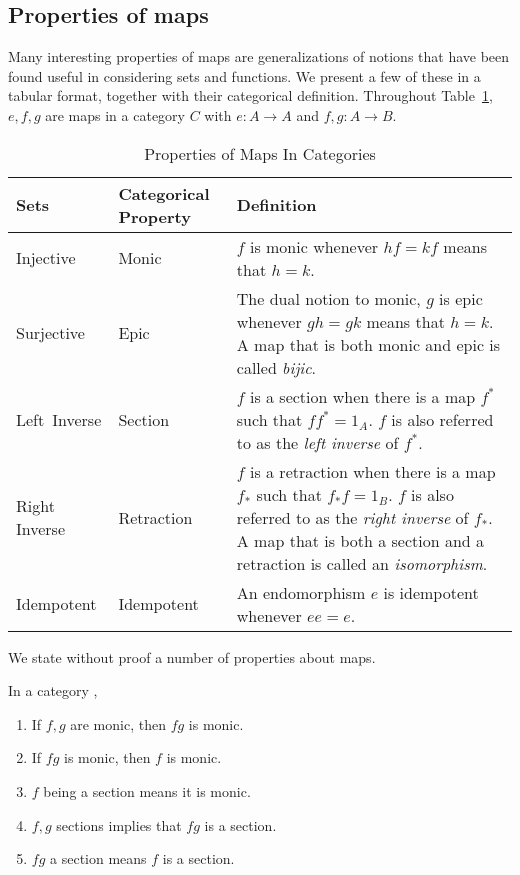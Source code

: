 \subsection{Properties of maps} %
\label{sub:properties_of_maps}
Many interesting properties of maps are generalizations of notions that have been found useful in
considering sets and functions. We present a few of these in a tabular format, together with their
categorical definition. Throughout Table~\ref{tab:properties_of_maps_in_categories}, $e,f,g$ are
maps in a category $C$ with $e:A \to A$ and $f,g:A \to B$.
\begin{table}[h!]
  \begin{center}
    \begin{tabular}{|p{1in}p{1in}p{3.73in}|}
      \hline
      {\bf Sets} & {\bf Categorical Property} & {\bf Definition}\\
      \hline
      \hline
      Injective & Monic & $f$ is monic whenever $h f = k f$ means that $h = k$.\\
      \hline
      Surjective & Epic & The dual notion to monic, $g$ is epic whenever $g h = g k$ means that $h = k$.
      A map that is both monic and epic is called \emph{bijic}.\\
      \hline
      Left~Inverse & Section & $f$ is a section when there is a map $f^*$ such that $f f^* = 1_A$. $f$
      is also referred to as the \emph{left inverse} of $f^*$.\\
      \hline
      Right Inverse & Retraction & $f$ is a retraction when there is a map $f_*$ such that $f_* f = 1_B$.
      $f$ is also referred to as the \emph{right inverse} of $f_*$. A map that is both a section and a
      retraction is called an \emph{isomorphism}.\\
      \hline
      Idempotent & Idempotent & An endomorphism $e$ is idempotent whenever $e e = e$.\\
      \hline
    \end{tabular}
  \end{center}
  \caption{Properties of Maps In Categories}
  \label{tab:properties_of_maps_in_categories}
\end{table}

We state without proof a number of properties about maps.

\begin{lemma}\label{lem:categorical_properties_of_maps}
  In a category \C,
  \begin{enumerate}[{(}i{)}]
    \item If $f,g$ are monic, then $f g$ is monic.
    \item If $f g$ is monic, then $f$ is monic.
    \item $f$ being a section means it is monic.
    \item $f, g$ sections implies that $f g$ is a section.
    \item $f g$ a section means $f$ is a section.
  \end{enumerate}
\end{lemma}


